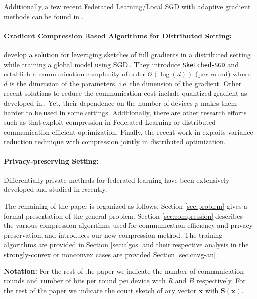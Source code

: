 Additionally, a few recent Federated Learning/Local SGD with adaptive gradient methods can be found in \cite{reddi2020adaptive,}.



\paragraph{Gradient Compression Based Algorithms for Distributed Setting:} \cite{ivkin2019communication} develop a solution for leveraging sketches of full gradients in a distributed setting while training a global model using SGD \cite{robbins1951stochastic, bottou2008tradeoffs}. They introduce \texttt{Sketched-SGD} and establish a communication complexity of order $\mathcal{O}(\log(d))$ (per round) where $d$ is the dimension of the parameters, i.e. the dimension of the gradient.
Other recent solutions to reduce the communication cost include quantized gradient as developed in \cite{alistarh2017qsgd,lin2017deep,stich2018sparsified,horvath2019stochastic}. 
Yet, their dependence on the number of devices $p$ makes them harder to be used in some settings. Additionally, there are other research efforts such as \cite{haddadpour2020federated,reisizadeh2019fedpaq,basu2019qsparse,horvath2019stochastic} that exploit compression in Federated Learning or distributed communication-efficient optimization. 
Finally, the recent work in \cite{horvath2020better} exploits variance reduction technique with compression jointly in distributed optimization.



\paragraph{Privacy-preserving Setting:} Differentially private methods for federated learning have been extensively developed and studied in \cite{li2019privacy,liu2019enhancing} recently. 

The remaining of the paper is organized as follows.
Section \ref{sec:problem} gives a formal presentation of the general problem. 
Section \ref{sec:compression} describes the various compression algorithms used for communication efficiency and privacy preservation, and introduces our new compression method.
The training algorithms are provided in Section \ref{sec:algos} and their respective analysis in the strongly-convex or nonconvex cases are provided Section \ref{sec:cnvg-an}.

\textbf{Notation:} For the rest of the paper we indicate the number of communication rounds and number of bits per round per device with $R$ and $B$ respectively. For the rest of the paper we indicate the count sketch of any vector $\boldsymbol{x}$ with $\mathbf{S}(\boldsymbol{x})$.








